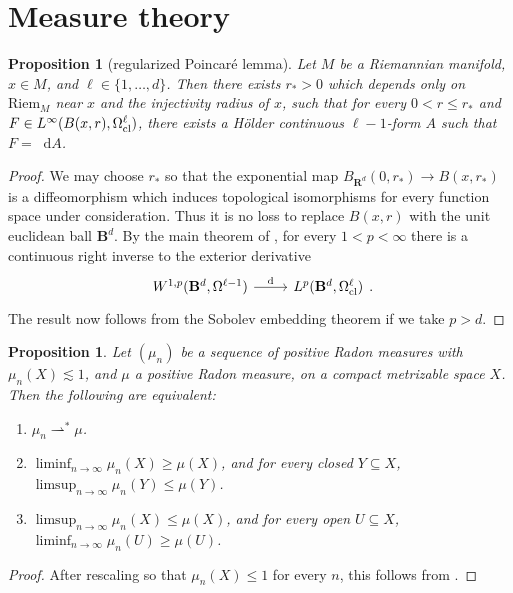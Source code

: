 \documentclass[reqno,11pt]{amsart}
\newcommand{\RR}{\mathbf{R}}
\newcommand{\Ball}{\mathbf{B}}
\newcommand*\dif{\mathop{}\!\mathrm{d}}
\newcommand{\weakto}{\rightharpoonup}
\newcommand{\Riem}{\mathrm{Riem}}
\newtheorem{proposition}[theorem]{Proposition}
\theoremstyle{definition}
\numberwithin{equation}{section}
\begin{document}
\appendix
\section{Measure theory}\label{GMT appendix}
\begin{proposition}[regularized Poincar\'e lemma]\label{Hodge theorem}
Let $M$ be a Riemannian manifold, $x \in M$, and $\ell \in \{1, \dots, d\}$.
Then there exists $r_* > 0$ which depends only on $\Riem_M$ near $x$ and the injectivity radius of $x$, such that for every $0 < r \leq r_*$ and $F \in L^\infty(B(x, r), \Omega^\ell_{\rm cl})$, there exists a H\"older continuous $\ell - 1$-form $A$ such that $F = \dif A$.
\end{proposition}
\begin{proof}
We may choose $r_*$ so that the exponential map $B_{\RR^d}(0, r_*) \to B(x, r_*)$ is a diffeomorphism which induces topological isomorphisms for every function space under consideration.
Thus it is no loss to replace $B(x, r)$ with the unit euclidean ball $\Ball^d$.
By the main theorem of \cite{Costabel2010}, for every $1 < p < \infty$ there is a continuous right inverse to the exterior derivative
\[\begin{tikzcd}
	{W^{1, p}(\Ball^d, \Omega^{\ell - 1})} & {L^p(\Ball^d, \Omega^\ell_{\rm cl})}
	\arrow["{\mathrm d}", from=1-1, to=1-2]
\end{tikzcd}.\]
The result now follows from the Sobolev embedding theorem if we take $p > d$.
\end{proof}

\begin{proposition}\label{portmanteau}
Let $(\mu_n)$ be a sequence of positive Radon measures with $\mu_n(X) \lesssim 1$, and $\mu$ a positive Radon measure, on a compact metrizable space $X$.
Then the following are equivalent:
\begin{enumerate}
\item $\mu_n \weakto^* \mu$.
\item $\liminf_{n \to \infty} \mu_n(X) \geq \mu(X)$, and for every closed $Y \subseteq X$, $\limsup_{n \to \infty} \mu_n(Y) \leq \mu(Y)$.
\item $\limsup_{n \to \infty} \mu_n(X) \leq \mu(X)$, and for every open $U \subseteq X$, $\liminf_{n \to \infty} \mu_n(U) \geq \mu(U)$.
\end{enumerate}
\end{proposition}
\begin{proof}
After rescaling so that $\mu_n(X) \leq 1$ for every $n$, this follows from \cite[Theorem 13.16]{klenke2013probability}.
\end{proof}
\end{document}
